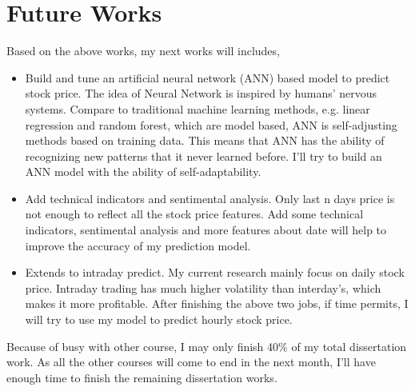 \documentclass[12pt,a4paper]{scrartcl}
\begin{document}
	\section{Future Works}
	Based on the above works, my next works will includes,
	\begin{itemize}
		\item Build and tune an artificial neural network (ANN) based model to predict stock price. The idea of Neural Network is inspired by humans' nervous systems. Compare to traditional machine learning methods, e.g. linear regression and random forest, which are model based, ANN is self-adjusting methods based on training data\cite{kimoto1990stock}. This means that ANN has the ability of recognizing new patterns that it never learned before. I'll try to build an ANN model with the ability of self-adaptability.
		\item Add technical indicators and sentimental analysis. Only last n days price is not enough to reflect all the stock price features. Add some technical indicators, sentimental analysis and more features about date will help to improve the accuracy of my prediction model.
		\item Extends to intraday predict. My current research mainly focus on daily stock price. Intraday trading has much higher volatility than interday's, which makes it more profitable. After finishing the above two jobs, if time permits, I will try to use my model to predict hourly stock price.
	\end{itemize}
	Because of busy with other course, I may only finish 40\% of my total dissertation work. As all the other courses will come to end in the next month, I'll have enough time to finish the remaining dissertation works. 
	
\end{document}
